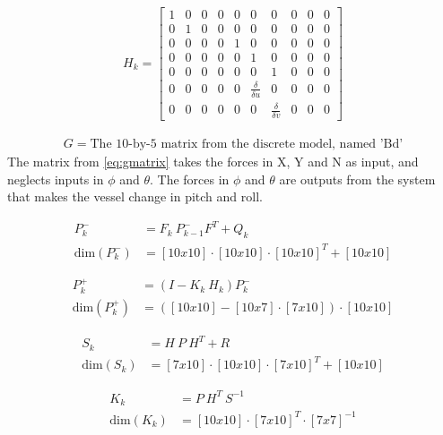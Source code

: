 \begin{align}
H_k =
\begin{bmatrix}
1 & 0 & 0 & 0 & 0 & 0 & 0 & 0 & 0 & 0 \\
0 & 1 & 0 & 0 & 0 & 0 & 0 & 0 & 0 & 0 \\
0 & 0 & 0 & 0 & 1 & 0 & 0 & 0 & 0 & 0 \\
0 & 0 & 0 & 0 & 0 & 1 & 0 & 0 & 0 & 0 \\
0 & 0 & 0 & 0 & 0 & 0 & 1 & 0 & 0 & 0 \\
0 & 0 & 0 & 0 & 0 & \frac{\delta}{\delta u} & 0 & 0 & 0 & 0 \\
0 & 0 & 0 & 0 & 0 & 0 & \frac{\delta}{\delta v} & 0 & 0 & 0
\end{bmatrix}
\end{align}

\begin{align}
G = \text{The 10-by-5 matrix from the discrete model, named 'Bd'}
\label{eq:gmatrix}
\end{align}
The matrix from \ref{eq:gmatrix} takes the forces in X, Y and N as input, and neglects inputs in $\phi$ and $\theta$. The forces in $\phi$ and $\theta$ are outputs from the system that makes the vessel change in pitch and roll.

\begin{align}
P_k^- &= F_k\ P_{k-1}^-F^T + Q_k\\
\text{dim}(P_k^-) &= [10x10]\cdot [10x10]\cdot [10x10]^T + [10x10]
\end{align}

\begin{align}
P_k^+ &= (I - K_k\ H_k)P_k^-\\
\text{dim}(P_k^+) &= ([10x10] - [10x7]\cdot [7x10])\cdot [10x10]
\end{align}

\begin{align}
S_k &= H\ P\ H^T + R\\
\text{dim}(S_k) &= [7x10]\cdot [10x10]\cdot [7x10]^T + [10x10]
\end{align}

\begin{align}
K_k &= P\ H^T\ S^{-1}\\
\text{dim}(K_k) &= [10x10]\cdot [7x10]^T\cdot [7x7]^{-1}
\end{align}